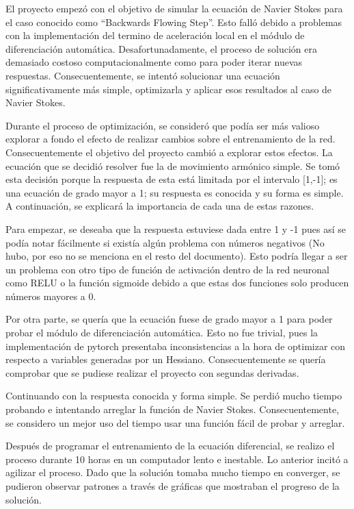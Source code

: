 \documentclass[11pt]{article}
\begin{document}
El proyecto empezó con el objetivo de simular la ecuación de Navier
Stokes para el caso conocido como ``Backwards Flowing Step''. Esto falló
debido a problemas con la implementación del termino de aceleración
local en el módulo de diferenciación automática. Desafortunadamente, el
proceso de solución era demasiado costoso computacionalmente como para
poder iterar nuevas respuestas. Consecuentemente, se intentó solucionar
una ecuación significativamente más simple, optimizarla y aplicar esos
resultados al caso de Navier Stokes.

Durante el proceso de optimización, se consideró que podía ser más
valioso explorar a fondo el efecto de realizar cambios sobre el
entrenamiento de la red. Consecuentemente el objetivo del proyecto
cambió a explorar estos efectos. La ecuación que se decidió resolver fue
la de movimiento armónico simple. Se tomó esta decisión porque la
respuesta de esta está limitada por el intervalo {[}1,-1{]}; es una
ecuación de grado mayor a 1; su respuesta es conocida y su forma es
simple. A continuación, se explicará la importancia de cada una de estas
razones.

Para empezar, se deseaba que la respuesta estuviese dada entre 1 y -1
pues así se podía notar fácilmente si existía algún problema con números
negativos (No hubo, por eso no se menciona en el resto del documento).
Esto podría llegar a ser un problema con otro tipo de función de
activación dentro de la red neuronal como RELU o la función sigmoide
debido a que estas dos funciones solo producen números mayores a 0.

Por otra parte, se quería que la ecuación fuese de grado mayor a 1 para
poder probar el módulo de diferenciación automática. Esto no fue
trivial, pues la implementación de pytorch presentaba inconsistencias a
la hora de optimizar con respecto a variables generadas por un Hessiano.
Consecuentemente se quería comprobar que se pudiese realizar el proyecto
con segundas derivadas.

Continuando con la respuesta conocida y forma simple. Se perdió mucho
tiempo probando e intentando arreglar la función de Navier Stokes.
Consecuentemente, se considero un mejor uso del tiempo usar una función
fácil de probar y arreglar.

Después de programar el entrenamiento de la ecuación diferencial, se
realizo el proceso durante 10 horas en un computador lento e inestable.
Lo anterior incitó a agilizar el proceso. Dado que la solución tomaba
mucho tiempo en converger, se pudieron observar patrones a través de
gráficas que mostraban el progreso de la solución.
\end{document}
